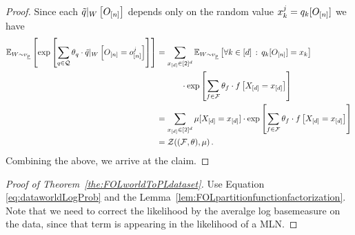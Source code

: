 \begin{proof}
	Since each ${\tilde{q}}|_{W} \left[O_{[n]}\right]$ depends only on the random value $x_{k}^j=q_{k}[O_{[n]}]$ we have
	\begin{align*}
		\mathbb{E}_{W\sim\nu_{\underline{p}}}\left[
			\mathrm{exp}\left[ \sum_{q\in\mathcal{Q}} \theta_{q} \cdot {\tilde{q}}|_{W} \left[O_{[n]} = o_{[n]}^{j}\right] \right] 
		\right] 
		& = \sum_{x_{[d]} \in [2]^d} 
		\mathbb{E}_{W\sim\nu_{\underline{p}}}\left[\forall {k\in[d]} \, : \, q_{k}[O_{[n]}]=x_{k}\right] \\
		& \quad \quad \quad  \cdot 
		\mathrm{exp}\left[\sum_{f\in\mathcal{F}} \theta_{f} \cdot f\left[X_{[d]}=x_{[d]}\right]\right]
		 \\
		& = \sum_{x_{[d]} \in [2]^d} \mu[X_{[d]}=x_{[d]}] \cdot 
		\mathrm{exp}\left[\sum_{f\in\mathcal{F}} \theta_{f} \cdot f\left[X_{[d]}=x_{[d]}\right]\right]
		 \\
		& = \mathcal{Z}{\left((\mathcal{F},\theta), \mu\right)} \, . 
	\end{align*}
	Combining the above, we arrive at the claim.
\end{proof}

\begin{proof}[Proof of Theorem~\ref{the:FOLworldToPLdataset}]
	Use Equation \ref{eq:dataworldLogProb} and the Lemma~\ref{lem:FOLpartitionfunctionfactorization}.
	Note that we need to correct the likelihood by the averalge log basemeasure on the data, since that term is appearing in the likelihood of a MLN.
\end{proof}


